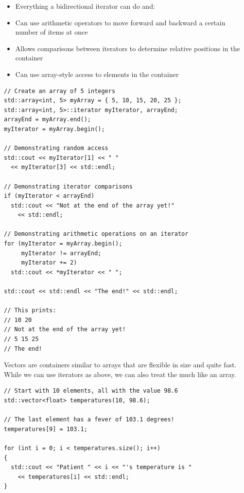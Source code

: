 
\begin{itemize}
	\item Everything a bidirectional iterator can do and:
	\item Can use arithmetic operators to move forward and backward a certain number of items at once
	\item Allows comparisons between iterators to determine relative positions in the container
	\item Can use array-style access to elements in the container
\end{itemize}

\noindent\begin{minipage}{\linewidth}\begin{lstlisting}
// Create an array of 5 integers
std::array<int, 5> myArray = { 5, 10, 15, 20, 25 };
std::array<int, 5>::iterator myIterator, arrayEnd;
arrayEnd = myArray.end();
myIterator = myArray.begin();

// Demonstrating random access
std::cout << myIterator[1] << " " 
  << myIterator[3] << std::endl;

// Demonstrating iterator comparisons
if (myIterator < arrayEnd)
  std::cout << "Not at the end of the array yet!"
    << std::endl;

// Demonstrating arithmetic operations on an iterator
for (myIterator = myArray.begin();
     myIterator != arrayEnd;
     myIterator += 2)
  std::cout << *myIterator << " ";

std::cout << std::endl << "The end!" << std::endl;

// This prints:
// 10 20
// Not at the end of the array yet!
// 5 15 25
// The end!
\end{lstlisting}\end{minipage}


Vectors are containers similar to arrays that are flexible in size and quite fast. 
While we can use iterators as above, we can also treat the  much like an array.

\noindent\begin{minipage}{\linewidth}\begin{lstlisting}
// Start with 10 elements, all with the value 98.6
std::vector<float> temperatures(10, 98.6); 

// The last element has a fever of 103.1 degrees!
temperatures[9] = 103.1; 

for (int i = 0; i < temperatures.size(); i++)
{
  std::cout << "Patient " << i << "'s temperature is " 
    << temperatures[i] << std::endl;
}
\end{lstlisting}\end{minipage}

